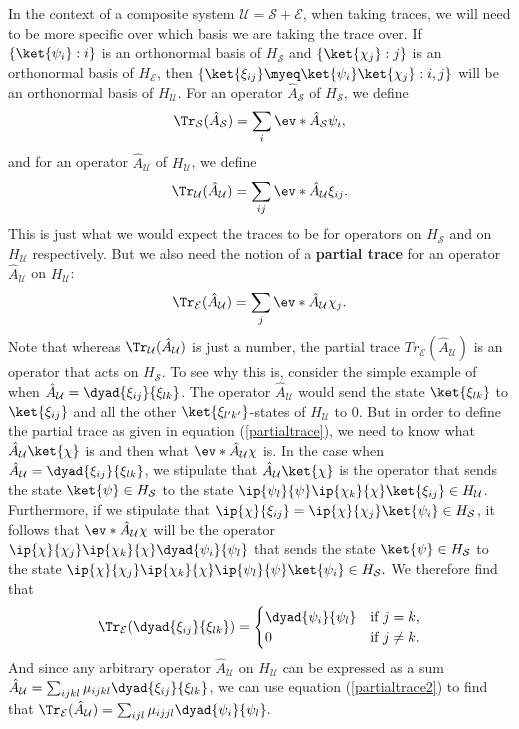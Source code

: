     In the context of a composite system $\mathcal{U}=\mathcal{S}+\mathcal{E}$, when taking traces, we will need to be more specific over which basis we are taking the trace over.  If $\{\ket{\psi_i}:i\}$ is an orthonormal basis of $H_\mathcal{S}$ and $\{\ket{\chi_j}:j\}$ is an orthonormal basis of $H_\mathcal{E}$, then $\{\ket{\xi_{ij}}\myeq\ket{\psi_i}\ket{\chi_j}:i,j\}$ will be an orthonormal basis of $H_\mathcal{U}$. For an operator $\hat{A}_\mathcal{S}$ of $H_\mathcal{S}$, we define 
    $$\Tr_\mathcal{S}(\hat{A}_\mathcal{S})=\sum_i \ev*{\hat{A}_\mathcal{S}}{\psi_i},$$
     and for an operator $\hat{A}_\mathcal{U}$ of $H_\mathcal{U}$, we define 
     $$\Tr_\mathcal{U}(\hat{A}_\mathcal{U})=\sum_{ij} \ev*{\hat{A}_\mathcal{U}}{\xi_{ij}}.$$
    This is just what we would expect the traces to be for operators on $H_\mathcal{S}$ and on $H_\mathcal{U}$ respectively. But we also need the notion of a \textbf{partial trace} for an operator $\hat{A}_\mathcal{U}$ on $H_\mathcal{U}$: 
    \begin{equation}\label{partialtrace} \Tr_\mathcal{E}(\hat{A}_\mathcal{U})=\sum_j \ev*{\hat{A}_\mathcal{U}}{\chi_j}.\end{equation} 
    Note that whereas $\Tr_\mathcal{U}(\hat{A}_\mathcal{U})$ is just a number, the partial trace $Tr_\mathcal{E}(\hat{A}_\mathcal{U})$  is an operator that acts on $H_\mathcal{S}$. To see why this is, consider the simple example of when $\hat{A}_\mathcal{U}=\dyad{\xi_{ij}}{\xi_{lk}}$. The operator $\hat{A}_\mathcal{U}$ would send the state $\ket{\xi_{lk}}$ to $\ket{\xi_{ij}}$ and all the other $\ket{\xi_{l'k'}}$-states of $H_\mathcal{U}$ to $0$. But in order to define the partial trace as given in equation (\ref{partialtrace}), we need to know what $\hat{A}_\mathcal{U}\ket{\chi}$ is and then what $\ev*{\hat{A}_\mathcal{U}}{\chi}$ is. In the case when $\hat{A}_\mathcal{U}=\dyad{\xi_{ij}}{\xi_{lk}}$, we stipulate that $\hat{A}_\mathcal{U}\ket{\chi}$ is the operator that sends the state $\ket{\psi}\in H_\mathcal{S}$ to the state $\ip{\psi_l}{\psi}\ip{\chi_k}{\chi}\ket{\xi_{ij}}\in H_\mathcal{U}$.  Furthermore, if we stipulate that $\ip{\chi}{\xi_{ij}}=\ip{\chi}{\chi_j}\ket{\psi_i}\in H_\mathcal{S}$, it follows that $\ev*{\hat{A}_\mathcal{U}}{\chi}$ will be the operator $\ip{\chi}{\chi_j}\ip{\chi_k}{\chi}\dyad{\psi_i}{\psi_l}$ that sends  the state $\ket{\psi}\in H_\mathcal{S}$ to the state  $\ip{\chi}{\chi_j}\ip{\chi_k}{\chi}\ip{\psi_l}{\psi}\ket{\psi_i}\in H_\mathcal{S}.$ We therefore find that
    \begin{equation} \label{partialtrace2}
    \Tr_\mathcal{E}(\dyad{\xi_{ij}}{\xi_{lk}})=
    \begin{cases} \dyad{\psi_i}{\psi_l} & \text{if $j=k$,} \\
    0 & \text{if $j\neq k$}.
    \end{cases}
    \end{equation}
    And since any arbitrary  operator $\hat{A}_\mathcal{U}$ on $H_\mathcal{U}$ can be expressed as a sum $\hat{A}_\mathcal{U}=\sum_{ijkl}\mu_{ijkl}\dyad{\xi_{ij}}{\xi_{lk}}$, we can use equation (\ref{partialtrace2}) to find that $\Tr_\mathcal{E}(\hat{A}_\mathcal{U})=\sum_{ijl}\mu_{ijjl}\dyad{\psi_i}{\psi_l}.$
    
